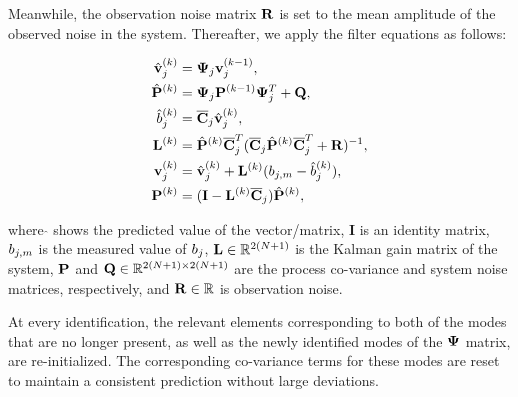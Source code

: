 \documentclass[letterpaper, 10 pt, journal, twoside]{IEEEtran}
\begin{document}
Meanwhile, the observation noise matrix $\mathbf{R}$ is set to the mean amplitude of the observed noise in the system. Thereafter, we apply the filter equations as follows:

\begin{small}
\begin{equation}
\begin{aligned}
    \hat{\mathbf{v}}_j^{(k)} &= \mathbf{\Psi}_j \mathbf{v}_j^{(k-1)},\\
    \hat{\mathbf{P}}^{(k)} &= \mathbf{\Psi}_j\mathbf{P}^{(k-1)}\mathbf{\Psi}_j^T + \mathbf{Q},\\
    \hat{b}_j^{(k)} &= \overline{\mathbf{C}}_j\hat{\mathbf{v}}_j^{(k)},\\
    \mathbf{L}^{(k)} &= \hat{\mathbf{P}}^{(k)}\overline{\mathbf{C}}_j^T(\overline{\mathbf{C}}_j\hat{\mathbf{P}}^{(k)}\overline{\mathbf{C}}_j^T + \mathbf{R})^{-1},\\
    \mathbf{v}_j^{(k)} &= \hat{\mathbf{v}}_j^{(k)} + \mathbf{L}^{(k)}(b_{j,m} - \hat{b}_j^{(k)}),\\
    \mathbf{P}^{(k)} &= (\mathbf{I} - \mathbf{L}^{(k)}\overline{\mathbf{C}}_j)\hat{\mathbf{P}}^{(k)},\\
\end{aligned}
\end{equation}
\end{small}\noindent
where $\hat{}$ shows the predicted value of the vector/matrix, $\mathbf{I}$ is an identity matrix, $b_{j,m}$ is the measured value of $b_j$, $\mathbf{L} \in \mathbb{R}^{2(N+1)}$ is the Kalman gain matrix of the system, $\mathbf{P}$ and $\mathbf{Q} \in \mathbb{R}^{2(N+1) \times 2(N+1)}$ are the process co-variance and system noise matrices, respectively, and $\mathbf{R} \in \mathbb{R}$ is observation noise. 

At every identification, the relevant elements corresponding to both of the modes that are no longer present, as well as the newly identified modes of the $\mathbf{\Psi}$ matrix, are re-initialized. The corresponding co-variance terms for these modes are reset to maintain a consistent prediction without large deviations.
\end{document}
